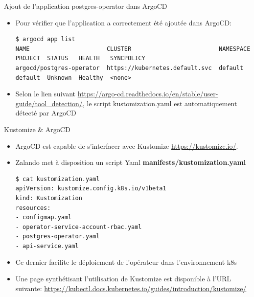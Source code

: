 \begin{frame}[fragile,shrink=5]{Ajout de l'application postgres-operator dans ArgoCD}

\begin{itemize}
   \item Pour vérifier que l'application a correctement été ajoutée dans ArgoCD:
\begin{tiny}
\begin{Verbatim}[commandchars=\&\#\#]
$ argocd app list
NAME                      CLUSTER                         NAMESPACE  PROJECT  STATUS   HEALTH   SYNCPOLICY  
argocd/postgres-operator  https://kubernetes.default.svc  default    default  Unknown  Healthy  <none>      
\end{Verbatim}
\end{tiny}
   \item Selon le lien suivant \url{https://argo-cd.readthedocs.io/en/stable/user-guide/tool_detection/}, le script kustomization.yaml est automatiquement détecté par ArgoCD
\end{itemize}

\end{frame}


\begin{frame}[fragile]{Kustomize \& ArgoCD}

\begin{itemize}
   \item ArgoCD est capable de s'interfacer avec Kustomize \url{https://kustomize.io/}.
   \item Zalando met à disposition un script Yaml \textbf{manifests/kustomization.yaml}
\begin{tiny}
\begin{Verbatim}[commandchars=\&\@\@]
$ cat kustomization.yaml 
apiVersion: kustomize.config.k8s.io/v1beta1
kind: Kustomization
resources:
- configmap.yaml
- operator-service-account-rbac.yaml
- postgres-operator.yaml
- api-service.yaml
\end{Verbatim}
\end{tiny}
   \item Ce dernier facilite le déploiement de l'opérateur dans l'environnement k8s
   \item Une page synthétisant l'utilisation de Kustomize est disponible à l'URL suivante: \url{https://kubectl.docs.kubernetes.io/guides/introduction/kustomize/}
\end{itemize}

\end{frame}

